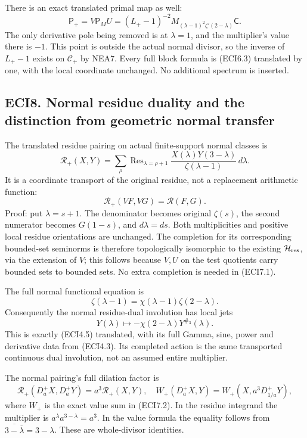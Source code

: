 There is an exact translated primal map as well: \[
\mathsf P_+=V\mathsf P_MU
=(L_+-1)^{-2}
M_{(\lambda-1)^2\zeta'(2-\lambda)}\mathsf C.
\tag{ECI7.5}
\] The only derivative pole being removed is at \(\lambda=1\), and the
multiplier's value there is \(-1\). This point is outside the actual
normal divisor, so the inverse of \(L_+-1\) exists on \(\mathscr C_+\)
by NEA7. Every full block formula is (ECI6.3) translated by one, with
the local coordinate unchanged. No additional spectrum is inserted.

\subsection{ECI8. Normal residue duality and the distinction from
geometric normal
transfer}\label{eci8.-normal-residue-duality-and-the-distinction-from-geometric-normal-transfer}

The translated residue pairing on actual finite-support normal classes
is \[
\mathcal R_+(X,Y)=\sum_{\rho}
\operatorname{Res}_{\lambda=\rho+1}
\frac{X(\lambda)Y(3-\lambda)}{\zeta(\lambda-1)}\,d\lambda.
\tag{ECI8.1}
\] It is a coordinate transport of the original residue, not a
replacement arithmetic function: \[
\mathcal R_+(VF,VG)=\mathcal R(F,G).
\tag{ECI8.2}
\] Proof: put \(\lambda=s+1\). The denominator becomes original
\(\zeta(s)\), the second numerator becomes \(G(1-s)\), and
\(d\lambda=ds\). Both multiplicities and positive local residue
orientations are unchanged. The completion for its corresponding
bounded-set seminorms is therefore topologically isomorphic to the
existing \(\mathcal H_{\rm res}\), via the extension of \(V\); this
follows because \(V,U\) on the test quotients carry bounded sets to
bounded sets. No extra completion is needed in (ECI7.1).

The full normal functional equation is \[
\zeta(\lambda-1)=\chi(\lambda-1)\zeta(2-\lambda).
\tag{ECI8.3}
\] Consequently the normal residue-dual involution has local jets \[
Y(\lambda)\longmapsto
-\chi(2-\lambda)Y^{\#_3}(\lambda).
\tag{ECI8.4}
\] This is exactly (ECI4.5) translated, with its full Gamma, sine, power
and derivative data from (ECI4.3). Its completed action is the same
transported continuous dual involution, not an assumed entire
multiplier.

The normal pairing's full dilation factor is \[
\mathcal R_+(D_a^+X,D_a^+Y)=a^3\mathcal R_+(X,Y),
\quad
W_+(D_a^+X,Y)=W_+(X,a^3D_{1/a}^+Y),
\tag{ECI8.5}
\] where \(W_+\) is the exact value sum in (ECI7.2). In the residue
integrand the multiplier is \(a^\lambda a^{3-\lambda}=a^3\). In the
value formula the equality follows from
\(\overline{3-\overline\lambda}=3-\lambda\). These are whole-divisor
identities.

